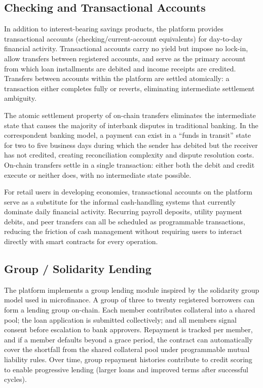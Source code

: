 \documentclass[12pt,a4paper]{report}
\begin{document}
\subsection{Checking and Transactional Accounts}

In addition to interest-bearing savings products, the platform provides transactional accounts (checking/current-account equivalents) for day-to-day financial activity. Transactional accounts carry no yield but impose no lock-in, allow transfers between registered accounts, and serve as the primary account from which loan installments are debited and income receipts are credited. Transfers between accounts within the platform are settled atomically: a transaction either completes fully or reverts, eliminating intermediate settlement ambiguity.

The atomic settlement property of on-chain transfers eliminates the intermediate state that causes the majority of interbank disputes in traditional banking. In the correspondent banking model, a payment can exist in a ``funds in transit'' state for two to five business days during which the sender has debited but the receiver has not credited, creating reconciliation complexity and dispute resolution costs. On-chain transfers settle in a single transaction: either both the debit and credit execute or neither does, with no intermediate state possible.

For retail users in developing economies, transactional accounts on the platform serve as a substitute for the informal cash-handling systems that currently dominate daily financial activity. Recurring payroll deposits, utility payment debits, and peer transfers can all be scheduled as programmable transactions, reducing the friction of cash management without requiring users to interact directly with smart contracts for every operation.

\subsection{Group / Solidarity Lending}

The platform implements a group lending module inspired by the solidarity group model used in microfinance. A group of three to twenty registered borrowers can form a lending group on-chain. Each member contributes collateral into a shared pool; the loan application is submitted collectively; and all members signal consent before escalation to bank approvers. Repayment is tracked per member, and if a member defaults beyond a grace period, the contract can automatically cover the shortfall from the shared collateral pool under programmable mutual liability rules. Over time, group repayment histories contribute to credit scoring to enable progressive lending (larger loans and improved terms after successful cycles).
\end{document}
